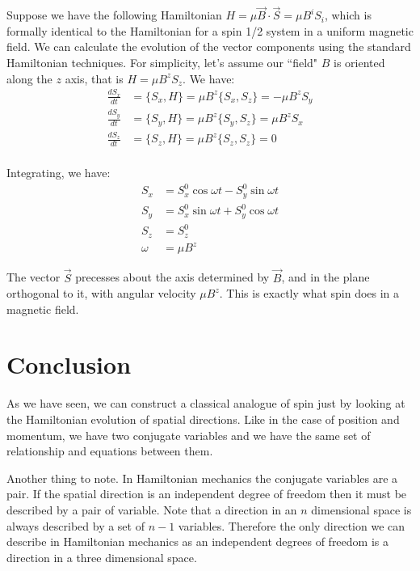 \documentclass[aps,pra,10pt,floatfix,nofootinbib]{revtex4-1}
\theoremstyle{definition}
\begin{document}
Suppose we have the following Hamiltonian $H=\mu\vec{B}\cdot\vec{S}=\mu B^i S_i$, which is formally identical to the Hamiltonian for a spin 1/2 system in a uniform magnetic field. We can calculate the evolution of the vector components using the standard Hamiltonian techniques. For simplicity, let's assume our ``field" $B$ is oriented along the $z$ axis, that is $H= \mu B^z S_z$. We have:
\begin{equation}
\begin{aligned}
\frac{dS_x}{dt} &= \{S_x, H\} = \mu B^z \{S_x, S_z\} = - \mu B^z S_y \\
\frac{dS_y}{dt} &= \{S_y, H\} = \mu B^z \{S_y, S_z\} = \mu B^z S_x \\
\frac{dS_z}{dt} &= \{S_z, H\} = \mu B^z \{S_z, S_z\} = 0 \\
\end{aligned}
\label{SpinEquations}
\end{equation}

Integrating, we have:
\begin{equation}
\begin{aligned}
S_x &= S^0_x \cos \omega t - S^0_y \sin \omega t \\
S_y &= S^0_x \sin \omega t + S^0_y \cos \omega t \\
S_z &= S^0_z \\
\omega &= \mu B^z
\end{aligned}
\label{SpinPrecession}
\end{equation}

The vector $\vec{S}$ precesses about the axis determined by $\vec{B}$, and in the plane orthogonal to it, with angular velocity $\mu B^z$. This is exactly what spin does in a magnetic field.

\section{Conclusion}

As we have seen, we can construct a classical analogue of spin just by looking at the Hamiltonian evolution of spatial directions. Like in the case of position and momentum, we have two conjugate variables and we have the same set of relationship and equations between them.

Another thing to note. In Hamiltonian mechanics the conjugate variables are a pair. If the spatial direction is an independent degree of freedom then it must be described by a pair of variable. Note that a direction in an $n$ dimensional space is always described by a set of $n-1$ variables. Therefore the only direction we can describe in Hamiltonian mechanics as an independent degrees of freedom is a direction in a three dimensional space.
\end{document}
